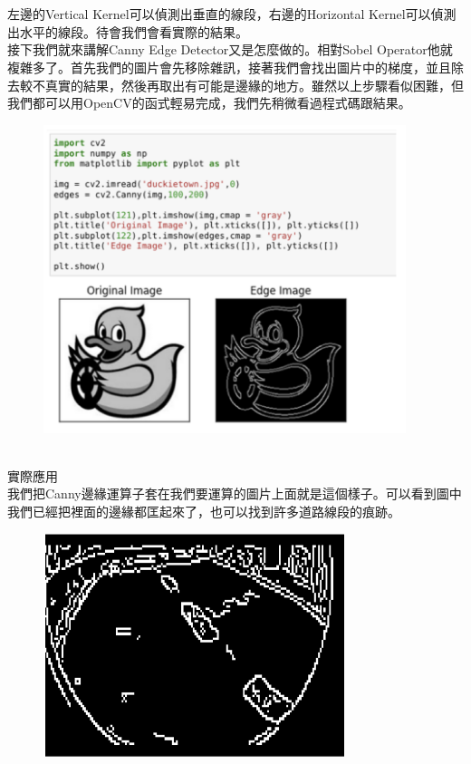 \documentclass{article}
\begin{document}
\\\\
左邊的Vertical Kernel可以偵測出垂直的線段，右邊的Horizontal Kernel可以偵測出水平的線段。待會我們會看實際的結果。
\\接下我們就來講解Canny Edge Detector又是怎麼做的。相對Sobel Operator他就複雜多了。首先我們的圖片會先移除雜訊，接著我們會找出圖片中的梯度，並且除去較不真實的結果，然後再取出有可能是邊緣的地方。雖然以上步驟看似困難，但我們都可以用OpenCV的函式輕易完成，我們先稍微看過程式碼跟結果。
\begin{figure}[htp]
    \begin{center}
        \includegraphics[width=300pt]{pic/3_2_6.png}
    \end{center}
\end{figure}
\\
實際應用
\\我們把Canny邊緣運算子套在我們要運算的圖片上面就是這個樣子。可以看到圖中我們已經把裡面的邊緣都匡起來了，也可以找到許多道路線段的痕跡。
\begin{figure}[htp]
    \begin{center}
        \includegraphics[width=250pt]{pic/3_2_19.png}
    \end{center}
\end{figure}
\\
\end{document}
